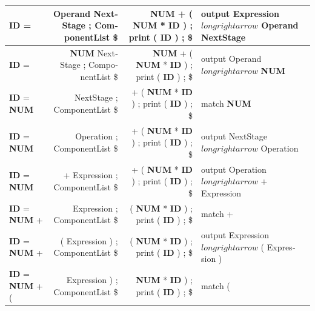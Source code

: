 \documentclass{article}
\begin{document}
\begin{latin}
\begin{table}[H]
{\begin{tabular}{|l|r|r|l|}
\textbf{ID} =                                                                         & Operand NextStage ; ComponentList \$        & \textbf{NUM} + ( \textbf{NUM} * \textbf{ID} ) ; print ( \textbf{ID} ) ; \$               & output Expression $longrightarrow$ Operand NextStage            \\ \hline
\textbf{ID} =                                                                         & \textbf{NUM} NextStage ; ComponentList \$   & \textbf{NUM} + ( \textbf{NUM} * \textbf{ID} ) ; print ( \textbf{ID} ) ; \$               & output Operand $longrightarrow$ \textbf{NUM}                    \\ \hline
\textbf{ID} = \textbf{NUM}                                                            & NextStage ; ComponentList \$                & + ( \textbf{NUM} * \textbf{ID} ) ; print ( \textbf{ID} ) ; \$                            & match \textbf{NUM}                                              \\ \hline
\textbf{ID} = \textbf{NUM}                                                            & Operation ; ComponentList \$                & + ( \textbf{NUM} * \textbf{ID} ) ; print ( \textbf{ID} ) ; \$                            & output NextStage $longrightarrow$ Operation                     \\ \hline
\textbf{ID} = \textbf{NUM}                                                            & + Expression ; ComponentList \$             & + ( \textbf{NUM} * \textbf{ID} ) ; print ( \textbf{ID} ) ; \$                            & output Operation $longrightarrow$ + Expression                  \\ \hline
\textbf{ID} = \textbf{NUM} +                                                          & Expression ; ComponentList \$               & ( \textbf{NUM} * \textbf{ID} ) ; print ( \textbf{ID} ) ; \$                              & match +                                                         \\ \hline
\textbf{ID} = \textbf{NUM} +                                                          & ( Expression ) ; ComponentList \$           & ( \textbf{NUM} * \textbf{ID} ) ; print ( \textbf{ID} ) ; \$                              & output Expression $longrightarrow$ ( Expression )               \\ \hline
\textbf{ID} = \textbf{NUM} + (                                                        & Expression ) ; ComponentList \$             & \textbf{NUM} * \textbf{ID} ) ; print ( \textbf{ID} ) ; \$                                & match (                                                         \\ \hline

\end{tabular}}
\end{table}
\end{latin}
\end{document}
